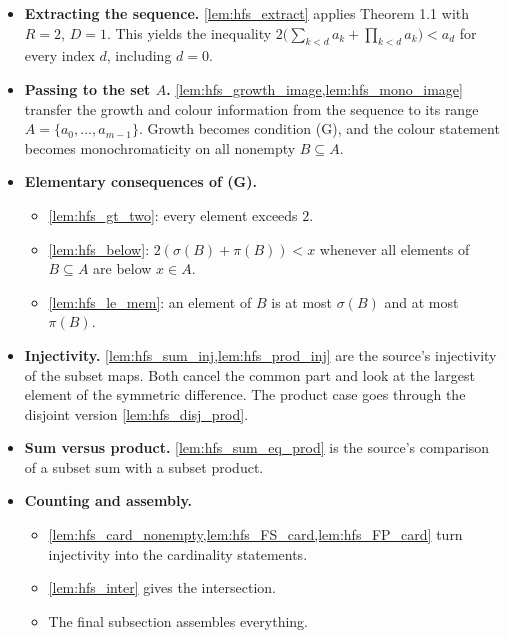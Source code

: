 \documentclass[11pt]{article}
\theoremstyle{definition}
\theoremstyle{remark}
\begin{document}
\begin{itemize}
 \item \textbf{Extracting the sequence.} \cref{lem:hfs_extract} applies Theorem 1.1 with $R=2$, $D=1$. This yields the inequality $2\bigl(\sum_{k<d}a_k+\prod_{k<d}a_k\bigr)<a_d$ for every index $d$, including $d=0$.
 \item \textbf{Passing to the set $A$.} \cref{lem:hfs_growth_image,lem:hfs_mono_image} transfer the growth and colour information from the sequence to its range $A=\{a_0,\ldots,a_{m-1}\}$. Growth becomes condition (G), and the colour statement becomes monochromaticity on all nonempty $B\subseteq A$.
 \item \textbf{Elementary consequences of (G).}
 \begin{itemize}
  \item \cref{lem:hfs_gt_two}: every element exceeds $2$.
  \item \cref{lem:hfs_below}: $2(\sigma(B)+\pi(B))<x$ whenever all elements of $B\subseteq A$ are below $x\in A$.
  \item \cref{lem:hfs_le_mem}: an element of $B$ is at most $\sigma(B)$ and at most $\pi(B)$.
 \end{itemize}
 \item \textbf{Injectivity.} \cref{lem:hfs_sum_inj,lem:hfs_prod_inj} are the source's injectivity of the subset maps. Both cancel the common part and look at the largest element of the symmetric difference. The product case goes through the disjoint version \cref{lem:hfs_disj_prod}.
 \item \textbf{Sum versus product.} \cref{lem:hfs_sum_eq_prod} is the source's comparison of a subset sum with a subset product.
 \item \textbf{Counting and assembly.}
 \begin{itemize}
  \item \cref{lem:hfs_card_nonempty,lem:hfs_FS_card,lem:hfs_FP_card} turn injectivity into the cardinality statements.
  \item \cref{lem:hfs_inter} gives the intersection.
  \item The final subsection assembles everything.
 \end{itemize}
\end{itemize}
\end{document}
